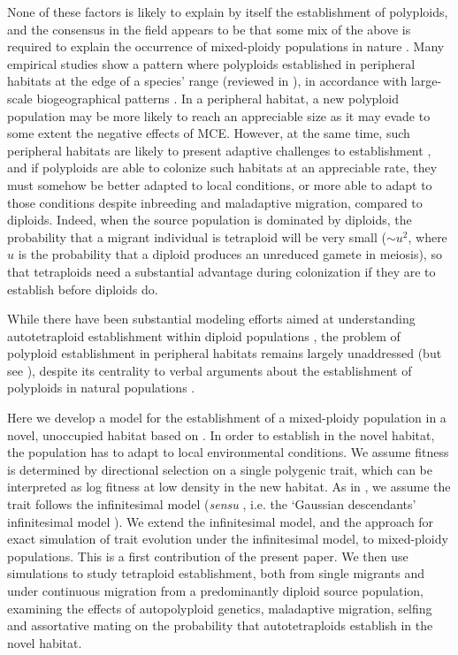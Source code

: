 \documentclass[12pt,a4paper]{article}
\begin{document}
None of these factors is likely to explain by itself the establishment of
polyploids, and the consensus in the field appears to be that some mix of the
above is required to explain the occurrence of mixed-ploidy populations in
nature \citep{kolar2017,mortier2024}.
Many empirical studies show a pattern where polyploids established in
peripheral habitats at the edge of a species' range (reviewed in
\cite{griswold2021}), in accordance with large-scale biogeographical patterns
\citep{rice2019}.
In a peripheral habitat, a new polyploid population may be more likely to reach
an appreciable size as it may evade to some extent the negative effects of MCE.
However, at the same time, such peripheral habitats are likely to present
adaptive challenges to establishment
\citep{kawecki2008adaptation,sachdeva2022b}, and if polyploids are able to
colonize such habitats at an appreciable rate, they must somehow be better
adapted to local conditions, or more able to adapt to those conditions despite
inbreeding and maladaptive migration, compared to diploids.
Indeed, when the source population is dominated by diploids, the probability
that a migrant individual is tetraploid will be very small ($\sim u^2$, where
$u$ is the probability that a diploid produces an unreduced gamete in meiosis),
so that tetraploids need a substantial advantage during colonization if they
are to establish before diploids do.

While there have been substantial modeling efforts aimed at understanding
autotetraploid establishment within diploid populations \citep{levin1975,
felber1991, felber1997, rausch2005, oswald2011, clo2022c}, the problem of
polyploid establishment in peripheral habitats remains largely unaddressed
(but see \cite{griswold2021}),
despite its centrality to verbal arguments about the establishment of
polyploids in natural populations \citep{kolar2017, vandepeer2021, clo2022d}.

Here we develop a model for the establishment of a mixed-ploidy population in a
novel, unoccupied habitat based on \cite{barton2018}.
In order to establish in the novel habitat, the population has to adapt to
local environmental conditions.
We assume fitness is determined by directional selection on a single polygenic
trait, which can be interpreted as log fitness at low density in the new
habitat.
As in \cite{barton2018}, we assume the trait follows the infinitesimal
model (\textit{sensu} \cite{barton2017}, i.e. the `Gaussian descendants'
infinitesimal model \citep{turelli2017}).
We extend the infinitesimal model, and the approach for exact simulation of
trait evolution under the infinitesimal model, to mixed-ploidy populations.
This is a first contribution of the present paper.
We then use simulations to study tetraploid establishment, both from single
migrants and under continuous migration from a predominantly diploid source
population, examining the effects of autopolyploid genetics,
maladaptive migration, selfing and assortative mating on the probability that
autotetraploids establish in the novel habitat.
\end{document}
